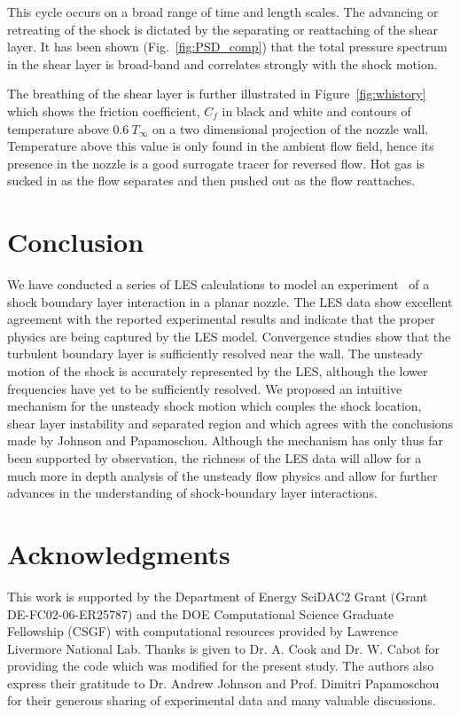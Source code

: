 \documentclass[]{aiaa-tc}%
\begin{document}
This cycle occurs on a broad range of time and length scales.  The advancing or retreating of the shock is dictated by the separating or reattaching of the shear layer.  It has been shown (Fig.~\ref{fig:PSD_comp}) that the total pressure spectrum in the shear layer is broad-band and correlates strongly with the shock motion.

The breathing of the shear layer is further illustrated in Figure~\ref{fig:whistory} which shows the friction coefficient, $C_f$ in black and white and contours of temperature above $0.6 \ T_{\infty}$ on a two dimensional projection of the nozzle wall.  Temperature above this value is only found in the ambient flow field, hence its presence in the nozzle is a good surrogate tracer for reversed flow.  Hot gas is sucked in as the flow separates and then pushed out as the flow reattaches.




\section{Conclusion}
We have conducted a series of LES calculations to model an experiment~\cite{Papam:10} of a shock boundary layer interaction in a planar nozzle.  The LES data show excellent agreement with the reported experimental results and indicate that the proper physics are being captured by the LES model.  Convergence studies show that the turbulent boundary layer is sufficiently resolved near the wall.  The unsteady motion of the shock is accurately represented by the LES, although the lower frequencies have yet to be sufficiently resolved.  We proposed an intuitive mechanism for the unsteady shock motion which couples the shock location, shear layer instability and separated region and which agrees with the conclusions made by Johnson and Papamoschou.  Although the  mechanism has only thus far been supported by observation, the richness of the LES data will allow for a much more in depth analysis of the unsteady flow physics and allow for further advances in the understanding of shock-boundary layer interactions. 



\section*{Acknowledgments}

This work is supported by the Department of Energy SciDAC2 Grant (Grant DE-FC02-06-ER25787) and the DOE Computational Science Graduate Fellowship (CSGF) with computational resources provided by Lawrence Livermore National Lab.  Thanks is given to Dr. A. Cook and Dr. W. Cabot for providing the code which was modified for the present study.  The authors also express their gratitude to Dr. Andrew Johnson and Prof. Dimitri Papamoschou for their generous sharing of experimental data and many valuable discussions.
\end{document}
